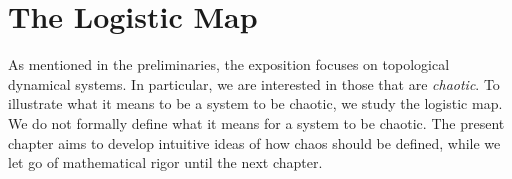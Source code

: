 \documentclass[10pt,twoside,draft]{book}
\begin{document}
\chapter{The Logistic Map}
\label{chap:logistic}
As mentioned in the preliminaries, the exposition focuses on topological dynamical systems.
In particular, we are interested in those that are \textit{chaotic}.
To illustrate what it means to be a system to be chaotic, we study the logistic map.
We do not formally define what it means for a system to be chaotic.
The present chapter aims to develop intuitive ideas of how chaos should be defined, while we let go of mathematical rigor until the next chapter.

\end{document}
